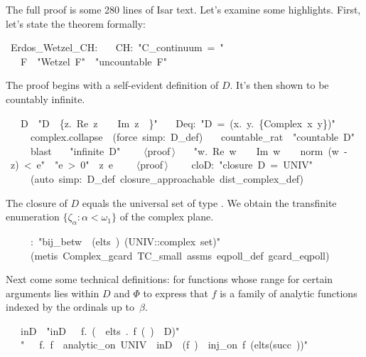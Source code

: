 \documentclass[runningheads]{llncs}
\begin{document}
\newcommand{\prf}{$\langle$proof$\,\rangle$}

The full proof is some 280 lines of Isar text. Let's examine some highlights.
First, let's state the theorem formally:
\begin{isabelle}
\ Erdos\_Wetzel\_CH:\isanewline
\ \ \ CH:\ "C\_continuum\ =\ "\isanewline
\ \ \ F\ \ "Wetzel\ F"\ \ "uncountable\ F"
\end{isabelle}
%
The proof begins with a self-evident definition of $D$. It's then shown to be countably infinite.
\begin{isabelle}
\ \ \ D\ \ "D\ \isasymequiv \ \{z.\ Re\ z\ \isasymin \ \isasymrat \ \isasymand \ Im\ z\ \isasymin \ \isasymrat \}"\isanewline
\ \ \ Deq:\ "D\ =\ (\isasymUnion x\isasymin \isasymrat .\ \isasymUnion y\isasymin \isasymrat .\ \{Complex\ x\ y\})"\isanewline
\ \ \ \ \ complex.collapse\ \ (force\ simp:\ D\_def)\isanewline
\ \ \ countable\_rat\ \ "countable\ D"\isanewline
\ \ \ \ \ blast\isanewline
\ \ \ "infinite\ D"\isanewline
\ \ \ \ \prf\isanewline
\ \ \ "\isasymexists w.\ Re\ w\ \isasymin \ \isasymrat \ \isasymand \ Im\ w\ \isasymin \ \isasymrat \ \isasymand \ norm\ (w\ -\ z)\ <\ e"\ \ "e\ >\ 0"\ \ z\ e\isanewline
\ \ \ \ \prf\isanewline
\ \ \ \ cloD:\ "closure\ D\ =\ UNIV"\isanewline
\ \ \ \ \ (auto\ simp:\ D\_def\ closure\_approachable\ dist\_complex\_def)
\end{isabelle}
The closure of $D$ equals the universal set  of type .
We obtain the transfinite enumeration $\{\zeta_\alpha : \alpha < \omega_1\}$ of the complex plane.
 \begin{isabelle}
\ \ \ \isasymzeta \ \ \isasymzeta :\ "bij\_betw\ \isasymzeta \ (elts\ )\ (UNIV::complex\ set)"\isanewline
\ \ \ \ \ (metis\ Complex\_gcard\ TC\_small\ assms\ eqpoll\_def\ gcard\_eqpoll)
\end{isabelle}
%
Next come some technical definitions:  for functions whose range for certain arguments lies within $D$ and $\Phi$ to express that $f$ is a family of analytic functions indexed by the ordinals up to~$\beta$. 

\begin{isabelle}
\ \ \ inD\ \ "inD\ \isasymequiv \ \isasymlambda \isasymbeta \ f.\ (\isasymforall \isasymalpha \ \isasymin \ elts\ \isasymbeta .\ f\ (\isasymzeta \ \isasymalpha )\ \isasymin \ D)"\isanewline
\ \ \ "\isasymPhi \ \isasymequiv\ \isasymlambda \isasymbeta \ f.\ f\ \isasymbeta \ analytic\_on\ UNIV\ \isasymand \ inD\ \isasymbeta \ (f\ \isasymbeta )\ \isasymand \ inj\_on\ f\ (elts(succ\ \isasymbeta ))"
\end{isabelle}
\end{document}
